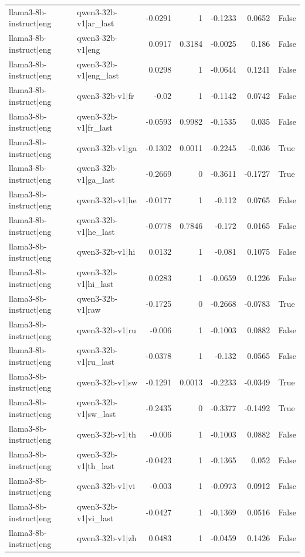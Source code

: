 \begin{table}
\begin{tabular}{l l r r r r l}
llama3-8b-instruct|eng & qwen3-32b-v1|ar_last & -0.0291 & 1 & -0.1233 & 0.0652 & False \\
llama3-8b-instruct|eng & qwen3-32b-v1|eng & 0.0917 & 0.3184 & -0.0025 & 0.186 & False \\
llama3-8b-instruct|eng & qwen3-32b-v1|eng_last & 0.0298 & 1 & -0.0644 & 0.1241 & False \\
llama3-8b-instruct|eng & qwen3-32b-v1|fr & -0.02 & 1 & -0.1142 & 0.0742 & False \\
llama3-8b-instruct|eng & qwen3-32b-v1|fr_last & -0.0593 & 0.9982 & -0.1535 & 0.035 & False \\
llama3-8b-instruct|eng & qwen3-32b-v1|ga & -0.1302 & 0.0011 & -0.2245 & -0.036 & True \\
llama3-8b-instruct|eng & qwen3-32b-v1|ga_last & -0.2669 & 0 & -0.3611 & -0.1727 & True \\
llama3-8b-instruct|eng & qwen3-32b-v1|he & -0.0177 & 1 & -0.112 & 0.0765 & False \\
llama3-8b-instruct|eng & qwen3-32b-v1|he_last & -0.0778 & 0.7846 & -0.172 & 0.0165 & False \\
llama3-8b-instruct|eng & qwen3-32b-v1|hi & 0.0132 & 1 & -0.081 & 0.1075 & False \\
llama3-8b-instruct|eng & qwen3-32b-v1|hi_last & 0.0283 & 1 & -0.0659 & 0.1226 & False \\
llama3-8b-instruct|eng & qwen3-32b-v1|raw & -0.1725 & 0 & -0.2668 & -0.0783 & True \\
llama3-8b-instruct|eng & qwen3-32b-v1|ru & -0.006 & 1 & -0.1003 & 0.0882 & False \\
llama3-8b-instruct|eng & qwen3-32b-v1|ru_last & -0.0378 & 1 & -0.132 & 0.0565 & False \\
llama3-8b-instruct|eng & qwen3-32b-v1|sw & -0.1291 & 0.0013 & -0.2233 & -0.0349 & True \\
llama3-8b-instruct|eng & qwen3-32b-v1|sw_last & -0.2435 & 0 & -0.3377 & -0.1492 & True \\
llama3-8b-instruct|eng & qwen3-32b-v1|th & -0.006 & 1 & -0.1003 & 0.0882 & False \\
llama3-8b-instruct|eng & qwen3-32b-v1|th_last & -0.0423 & 1 & -0.1365 & 0.052 & False \\
llama3-8b-instruct|eng & qwen3-32b-v1|vi & -0.003 & 1 & -0.0973 & 0.0912 & False \\
llama3-8b-instruct|eng & qwen3-32b-v1|vi_last & -0.0427 & 1 & -0.1369 & 0.0516 & False \\
llama3-8b-instruct|eng & qwen3-32b-v1|zh & 0.0483 & 1 & -0.0459 & 0.1426 & False \\

\end{tabular}
\end{table}
